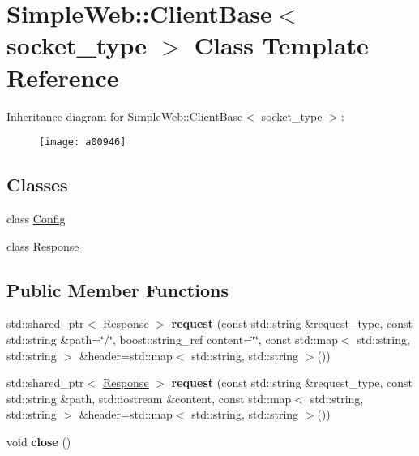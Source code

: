 \hypertarget{a00946}{}\section{Simple\+Web\+:\+:Client\+Base$<$ socket\+\_\+type $>$ Class Template Reference}
\label{a00946}
Inheritance diagram for Simple\+Web\+:\+:Client\+Base$<$ socket\+\_\+type $>$\+:\begin{figure}[H]
\begin{center}
\leavevmode
\texttt{[image: a00946]}
\end{center}
\end{figure}
\subsection*{Classes}
\begin{DoxyCompactItemize}
\item 
class \hyperlink{a00954}{Config}
\item 
class \hyperlink{a00950}{Response}
\end{DoxyCompactItemize}
\subsection*{Public Member Functions}
\begin{DoxyCompactItemize}
\item 
\mbox{\label{a00946_ac8a838ace77f0a1a19b8cb03bdba7e74}} 
std\+::shared\+\_\+ptr$<$ \hyperlink{a00950}{Response} $>$ {\bfseries request} (const std\+::string \&request\+\_\+type, const std\+::string \&path=\char`\"{}/\char`\"{}, boost\+::string\+\_\+ref content=\char`\"{}\char`\"{}, const std\+::map$<$ std\+::string, std\+::string $>$ \&header=std\+::map$<$ std\+::string, std\+::string $>$())
\item 
\mbox{\label{a00946_aca6cb17dbea9adf0cf1daf9d1ea70f76}} 
std\+::shared\+\_\+ptr$<$ \hyperlink{a00950}{Response} $>$ {\bfseries request} (const std\+::string \&request\+\_\+type, const std\+::string \&path, std\+::iostream \&content, const std\+::map$<$ std\+::string, std\+::string $>$ \&header=std\+::map$<$ std\+::string, std\+::string $>$())
\item 
\mbox{\label{a00946_ad21735a9bda2fae6aedd811efae981e1}} 
void {\bfseries close} ()
\end{DoxyCompactItemize}
